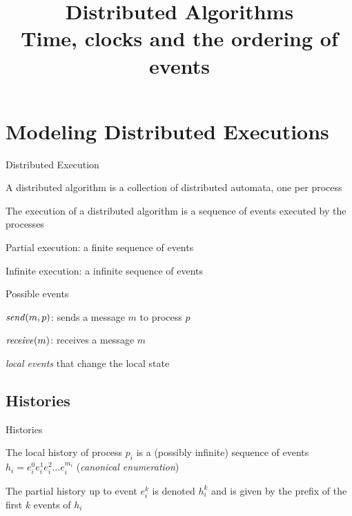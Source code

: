 
\title[DS - Time,clocks,events]{\textbf{Distributed Algorithms}\\Time, clocks and the ordering of events}



\begin{frame}
\titlepage
\end{frame}

\section{Modeling Distributed Executions}

\begin{frame}{Distributed Execution}

\begin{definition}
A \alert{distributed algorithm} is a collection of distributed automata,
one per process
\end{definition}
\vfill
\begin{definition}
	The \alert{execution} of a distributed algorithm is a sequence of \alert{events} executed
  by the processes
  \BI
  \item \alert{Partial execution}: a finite sequence of events
  \item \alert{Infinite execution}: a infinite sequence of events
  \EI
\end{definition}
\vfill
\begin{block}{Possible events}
  \BI
   \item $\mathit{send}(m,p)$: sends a message $m$ to process $p$
   \item $\mathit{receive}(m)$: receives a message $m$
   \item {\em local events} that change the local state
  \EI
\end{block}
\end{frame}

\subsection{Histories}

\begin{frame}{Histories}
	
\begin{definition}
The \alert{local history} of process $p_i$ is a (possibly infinite)
  sequence of events $h_i = e^0_i e^1_i e^2_i \ldots e^{m_i}_i$ (\emph{canonical enumeration})
\end{definition}
\vfill
\begin{definition}
The \alert{partial history} up to event $e^k_i$ is denoted $h^k_i$ and
  is given by the prefix of the first $k$ events of $h_i$
\end{definition}
\vfill

\end{frame}

